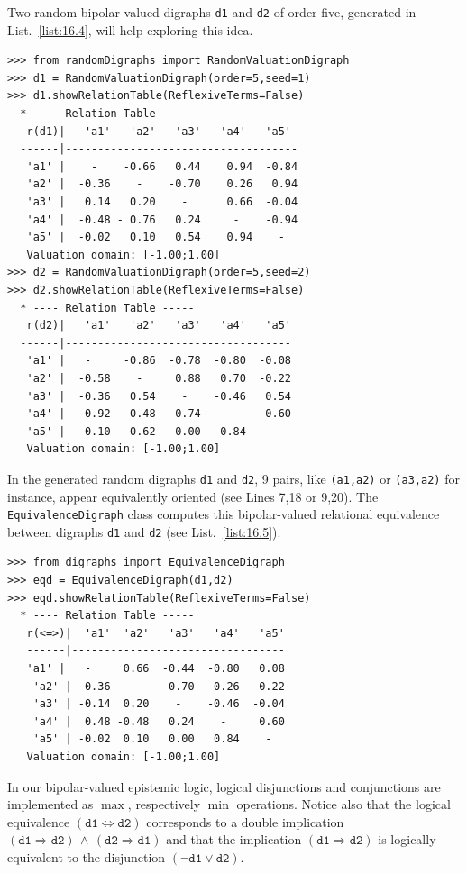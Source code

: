 Two random bipolar-valued digraphs \texttt{d1} and \texttt{d2} of order five, generated in List.~\vref{list:16.4}, will help exploring this idea.
\begin{lstlisting}[caption={Two random bipolar-valued digraphs},label=list:16.4]
>>> from randomDigraphs import RandomValuationDigraph
>>> d1 = RandomValuationDigraph(order=5,seed=1)
>>> d1.showRelationTable(ReflexiveTerms=False)
  * ---- Relation Table -----
   r(d1)|   'a1'   'a2'   'a3'   'a4'   'a5'	  
  ------|------------------------------------
   'a1' |    - 	  -0.66	  0.44	  0.94	-0.84	 
   'a2' |  -0.36    - 	 -0.70	  0.26	 0.94	 
   'a3' |   0.14   0.20	   - 	  0.66	-0.04	 
   'a4' |  -0.48 - 0.76	  0.24	   -  	-0.94	 
   'a5' |  -0.02   0.10	  0.54	  0.94    - 	 
   Valuation domain: [-1.00;1.00]
>>> d2 = RandomValuationDigraph(order=5,seed=2)
>>> d2.showRelationTable(ReflexiveTerms=False)
  * ---- Relation Table -----
   r(d2)|   'a1'   'a2'   'a3'   'a4'   'a5'	  
  ------|-----------------------------------
   'a1' |   -     -0.86  -0.78  -0.80  -0.08	 
   'a2' |  -0.58    -     0.88   0.70  -0.22	 
   'a3' |  -0.36   0.54    -    -0.46   0.54	 
   'a4' |  -0.92   0.48   0.74    -    -0.60	 
   'a5' |   0.10   0.62   0.00   0.84    - 	 
   Valuation domain: [-1.00;1.00]
\end{lstlisting}
In the generated random digraphs \texttt{d1} and \texttt{d2}, 9 pairs, like \texttt{(a1,a2)} or \texttt{(a3,a2)} for instance, appear equivalently oriented (see Lines 7,18 or 9,20). The \texttt{Equiva\-lenceDigraph} class computes this bipolar-valued relational equivalence between digraphs \texttt{d1} and \texttt{d2} (see List.~\vref{list:16.5}).
\begin{lstlisting}[caption={Bipolar-valued Equivalence Digraph},label=list:16.5]
>>> from digraphs import EquivalenceDigraph
>>> eqd = EquivalenceDigraph(d1,d2)
>>> eqd.showRelationTable(ReflexiveTerms=False)
  * ---- Relation Table -----
   r(<=>)|  'a1'  'a2'   'a3'   'a4'   'a5'	  
   ------|---------------------------------
   'a1' |   - 	  0.66  -0.44  -0.80   0.08	 
    'a2' |  0.36   -    -0.70   0.26  -0.22	 
    'a3' | -0.14  0.20    -    -0.46  -0.04	 
    'a4' |  0.48 -0.48   0.24    -     0.60	 
    'a5' | -0.02  0.10   0.00   0.84    - 	 
   Valuation domain: [-1.00;1.00]
\end{lstlisting}

In our bipolar-valued epistemic logic, logical disjunctions and conjunctions are implemented as $\max$, respectively $\min$ operations. Notice also that the logical equivalence $(\mathtt{d1} \Leftrightarrow \mathtt{d2})$ corresponds to a double implication $(\mathtt{d1} \Rightarrow \mathtt{d2})\, \wedge \, (\mathtt{d2} \Rightarrow  \mathtt{d1})$ and that the implication $(\mathtt{d1} \Rightarrow \mathtt{d2})$ is logically equivalent to the disjunction $(\neg \mathtt{d1} \vee \mathtt{d2})$.

